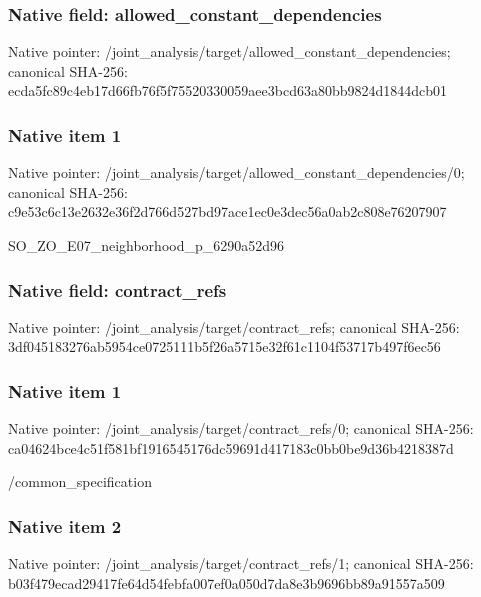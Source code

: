 \documentclass[10pt,a4paper]{article}
\begin{document}
\subsubsection{Native field: allowed\_\allowbreak{}constant\_\allowbreak{}dependencies}
Native pointer: /joint\_\allowbreak{}analysis/target/allowed\_\allowbreak{}constant\_\allowbreak{}dependencies; canonical SHA-256: ecda5fc89c4eb17d66fb76f5f75520330059aee3bcd63a80bb9824d1844dcb01

\subsubsection{Native item 1}
Native pointer: /joint\_\allowbreak{}analysis/target/allowed\_\allowbreak{}constant\_\allowbreak{}dependencies/0; canonical SHA-256: c9e53c6c13e2632e36f2d766d527bd97ace1ec0e3dec56a0ab2c808e76207907

\begingroup\raggedright\sloppy SO\_\allowbreak{}ZO\_\allowbreak{}E07\_\allowbreak{}neighborhood\_\allowbreak{}p\_\allowbreak{}6290a52d96\par\endgroup

\subsubsection{Native field: contract\_\allowbreak{}refs}
Native pointer: /joint\_\allowbreak{}analysis/target/contract\_\allowbreak{}refs; canonical SHA-256: 3df045183276ab5954ce0725111b5f26a5715e32f61c1104f53717b497f6ec56

\subsubsection{Native item 1}
Native pointer: /joint\_\allowbreak{}analysis/target/contract\_\allowbreak{}refs/0; canonical SHA-256: ca04624bce4c51f581bf1916545176dc59691d417183c0bb0be9d36b4218387d

\begingroup\raggedright\sloppy /\allowbreak{}common\_\allowbreak{}specification\par\endgroup

\subsubsection{Native item 2}
Native pointer: /joint\_\allowbreak{}analysis/target/contract\_\allowbreak{}refs/1; canonical SHA-256: b03f479ecad29417fe64d54febfa007ef0a050d7da8e3b9696bb89a91557a509
\end{document}
